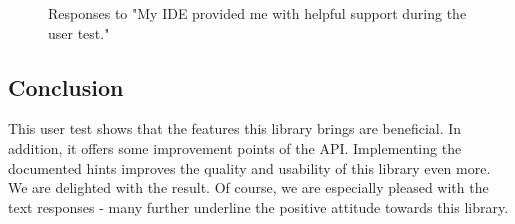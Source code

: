 \begin{figure}[H]
\centering
{}
\caption{Responses to "My IDE provided me with helpful support during the user
test."}
\label{fig:usertest_q3}
\end{figure}

\subsection{Conclusion} %
\label{sub:User_testing_evaluation_Conclusion}

This user test shows that the features this library brings are beneficial. In
addition, it offers some improvement points of the API. Implementing the
documented hints improves the quality and usability of this library even more.
We are delighted with the result. Of course, we are especially pleased with the
text responses - many further underline the positive attitude towards this
library. 

